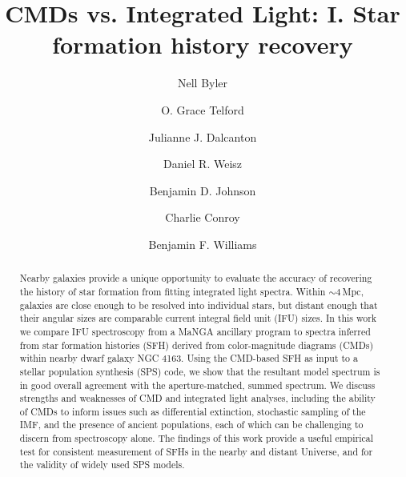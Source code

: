 \documentclass[preprint2]{aastex62}
\begin{document}
\title{CMDs vs. Integrated Light: I. Star formation history recovery}
\author[0000-0002-7392-3637]{Nell Byler}
\author[0000-0003-4122-7749]{O. Grace Telford}
\author[0000-0002-1264-2006]{Julianne J. Dalcanton}
\author[0000-0002-6442-6030]{Daniel R. Weisz}
\author[0000-0002-9280-7594]{Benjamin D. Johnson}
\author[0000-0002-1590-8551]{Charlie Conroy}
\author[0000-0002-7502-0597]{Benjamin F. Williams}
\begin{abstract}

Nearby galaxies provide a unique opportunity to evaluate the accuracy of recovering the history of star formation from fitting integrated light spectra. Within ${\sim}4\,$Mpc, galaxies are close enough to be resolved into individual stars, but distant enough that their angular sizes are comparable current integral field unit (IFU) sizes. In this work we compare IFU spectroscopy from a MaNGA ancillary program to spectra inferred from star formation histories (SFH) derived from color-magnitude diagrams (CMDs) within nearby dwarf galaxy NGC 4163. Using the CMD-based SFH as input to a stellar population synthesis (SPS) code, we show that the resultant model spectrum is in good overall agreement with the aperture-matched, summed spectrum. We discuss strengths and weaknesses of CMD and integrated light analyses, including the ability of CMDs to inform issues such as differential extinction, stochastic sampling of the IMF, and the presence of ancient populations, each of which can be challenging to discern from spectroscopy alone. The findings of this work provide a useful empirical test for consistent measurement of SFHs in the nearby and distant Universe, and for the validity of widely used SPS models.

\end{abstract}
\end{document}
